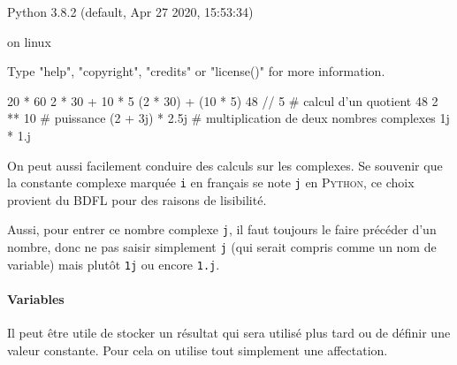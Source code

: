 
\begin{idleshell}[before skip=8pt, after skip=8pt]
Python 3.8.2 (default, Apr 27 2020, 15:53:34)\par
[GCC 9.3.0] on linux\par
Type "help", "copyright", "credits" or "license()" for more information.
\vspace*{-.25\baselineskip}
\begin{pyconsole}
	20 * 60
	2 * 30 + 10 * 5
	(2 * 30) + (10 * 5)
	48 // 5  # calcul d'un quotient
	48 %
	2 ** 10  # puissance
	(2 + 3j) * 2.5j  # multiplication de deux nombres complexes
	1j * 1.j
\end{pyconsole}
\end{idleshell}

On peut aussi facilement conduire des calculs sur les complexes. Se souvenir que la constante complexe marquée \texttt{i} en français se note \texttt{j} en \textsc{Python}, ce choix provient du BDFL pour des raisons de lisibilité.

Aussi, pour entrer ce nombre complexe \texttt{j}, il faut toujours le faire précéder d'un nombre, donc ne pas saisir simplement \texttt{j} (qui serait compris comme un nom de variable) mais plutôt \texttt{1j} ou encore \texttt{1.j}.

\paragraph{Variables} Il peut être utile de stocker un résultat qui sera utilisé plus tard ou de définir une valeur constante. Pour cela on utilise tout simplement une affectation.

